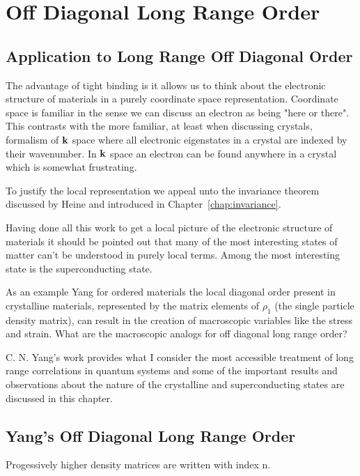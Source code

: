 \chapter{Off Diagonal Long Range Order}
\section{Application to Long Range Off Diagonal Order}
The advantage of tight binding is it allows us to think about
the electronic structure of materials in a purely coordinate space representation.
Coordinate space is familiar in the sense we can discuss an electron as being
"here or there". This contrasts with the more familiar, at least when discussing crystals,
formalism of ${\bf k}$ space where all electronic eigenstates in a crystal are indexed by
their wavenumber. In ${\bf k}$ space an electron can be found anywhere in a crystal which
is somewhat frustrating. 

To justify the local representation we appeal unto the invariance theorem discussed 
by Heine and introduced in Chapter~\ref{chap:invariance}.

Having done all this work to get a local picture of the electronic structure of materials
it should be pointed out that many of the most interesting states of matter can't 
be understood in purely local terms. Among the most interesting state is the
superconducting state.

As an example Yang for ordered materials the local diagonal order present in crystalline materials,
represented by the matrix elements of $\rho_{1}$ (the single particle density matrix),
can result in the creation of macroscopic variables like the stress and strain.
What are the macroscopic analogs for off diagonal long range order?

C. N. Yang's work provides what I consider the most accessible treatment of long range
correlations in quantum systems and some of the important results and observations about
the nature of the crystalline and superconducting states are discussed in this chapter. 

\section{Yang's Off Diagonal Long Range Order}
Progessively higher density matrices are written with index n. 

